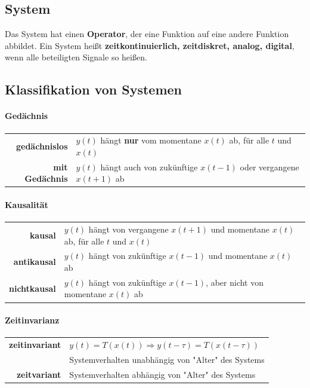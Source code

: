 \documentclass[10pt,a4paper]{article}
\begin{document}
\subsection*{System}
	Das System hat einen \textbf{Operator}, der eine Funktion auf eine andere Funktion abbildet. Ein System heißt \textbf{zeitkontinuierlich, zeitdiskret, analog, digital}, wenn alle beteiligten Signale so heißen.
\subsection*{Klassifikation von Systemen}
\paragraph*{Gedächnis}
\begin{tabular}{r >{\centering\arraybackslash} p{9cm}}
	\textbf{gedächnislos} & $y(t)$ hängt \textbf{nur} vom momentane $x(t)$ ab, für alle $t$ und $x(t)$\\
	\textbf{mit Gedächnis} & $y(t)$ hängt auch von zukünftige $x(t-1)$ oder vergangene $x(t+1)$ ab\\
\end{tabular}
\paragraph*{Kausalität}
\begin{tabular}{r >{\centering\arraybackslash} p{9cm}}
	\textbf{kausal} & $y(t)$ hängt von vergangene $x(t+1)$ und momentane $x(t)$ ab, für alle $t$ und $x(t)$\\
	\textbf{antikausal} & $y(t)$ hängt von zukünftige $x(t-1)$ und momentane $x(t)$ ab\\
	\textbf{nichtkausal} & $y(t)$ hängt von zukünftige $x(t-1)$, aber nicht von momentane $x(t)$ ab\\
\end{tabular}
\paragraph*{Zeitinvarianz}
\begin{tabular}{r >{\centering\arraybackslash} p{9cm}}
	\textbf{zeitinvariant} & $y(t)=T(x(t))\Rightarrow y(t-\tau)=T(x(t-\tau))$ \\
	& Systemverhalten unabhängig von "Alter" des Systems \\
	\textbf{zeitvariant} & Systemverhalten abhängig von "Alter" des Systems\\
\end{tabular}
\end{document}
